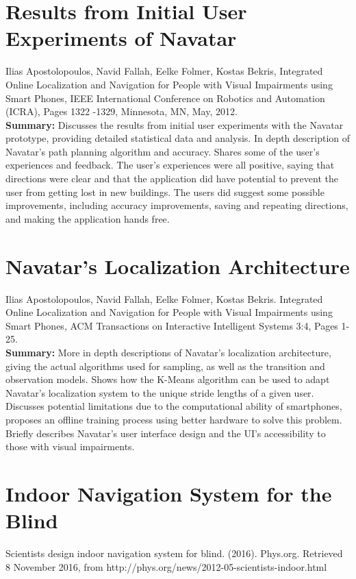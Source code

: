 \documentclass{scrreprt}
\begin{document}
\section{Results from Initial User Experiments of Navatar}
Ilias Apostolopoulos, Navid Fallah, Eelke Folmer, Kostas Bekris, Integrated Online Localization and Navigation for People with Visual Impairments using Smart Phones, IEEE International Conference on Robotics and Automation (ICRA), Pages 1322 -1329, Minnesota, MN, May, 2012.\\

\textbf{Summary:}
Discusses the results from initial user experiments with the Navatar prototype, providing detailed statistical data and analysis. In depth description of Navatar’s path planning algorithm and accuracy. Shares some of the user’s experiences and feedback. The user’s experiences were all positive, saying that directions were clear and that the application did have potential to prevent the user from getting lost in new buildings. The users did suggest some possible improvements, including accuracy improvements, saving and repeating directions, and making the application hands free.
\pagebreak
\section{Navatar’s Localization Architecture}
 Ilias Apostolopoulos, Navid Fallah, Eelke Folmer, Kostas Bekris. Integrated Online Localization and Navigation for People with Visual Impairments using Smart Phones, ACM Transactions on Interactive Intelligent Systems 3:4, Pages 1-25.\\

\textbf{Summary:}
More in depth descriptions of Navatar’s localization architecture, giving the actual algorithms used for sampling, as well as the transition and observation models. Shows how the K-Means algorithm can be used to adapt Navatar’s localization system to the unique stride lengths of a given user. Discusses potential limitations due to the computational ability of smartphones, proposes an offline training process using better hardware to solve this problem. Briefly describes Navatar’s user interface design and the UI’s accessibility to those with visual impairments.

\section{Indoor Navigation System for the Blind}
Scientists design indoor navigation system for blind. (2016). Phys.org. Retrieved 8 November 2016, from http://phys.org/news/2012-05-scientists-indoor.html\\
\end{document}
